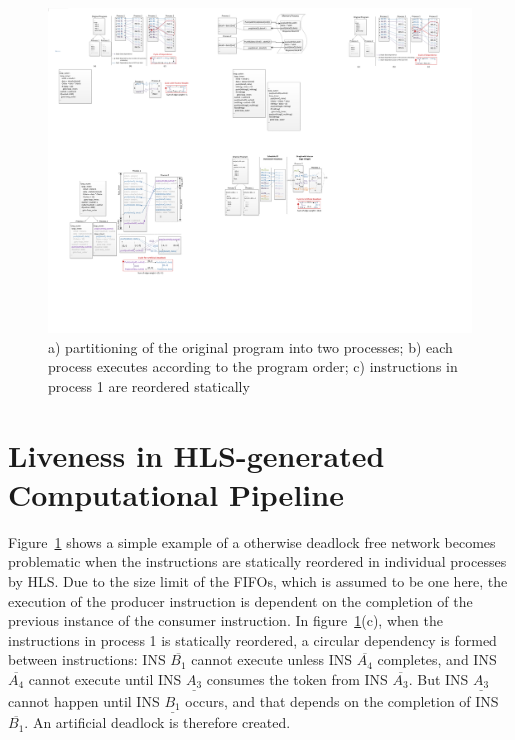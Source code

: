 \begin{figure}[htp]
\begin{center}
\includegraphics[width=1.0\linewidth]{chap4fig/cycleInstances.pdf}
\caption{a) partitioning of the original program into two processes; b) each process executes according to the program order; c) instructions in process 1 are reordered statically
\label{fig:deadlockfig}}
\end{center}
\end{figure}

\section{Liveness in HLS-generated Computational Pipeline }
Figure~\ref{fig:deadlockfig} shows a simple example of a otherwise deadlock free network becomes problematic
when the instructions are statically reordered in individual processes by HLS. 
Due to the size limit of the FIFOs, which is assumed to be one here, the execution
of the producer instruction is dependent on the completion of the previous instance
of the consumer instruction. In figure~\ref{fig:deadlockfig}(c), when the instructions in process 1 is statically reordered, a circular dependency is formed
between instructions: INS $\overline{B_1}$ cannot execute unless
INS $\overline{A_4}$ completes, and INS $\overline{A_4}$ cannot execute until
INS $\underline{A_3}$ consumes the token from INS $\overline{A_3}$. But INS $\underline{A_3}$ cannot happen until INS $\underline{B_1}$ occurs, and
that depends on the completion of INS $\overline{B_1}$.  An artificial deadlock
is therefore created. 

